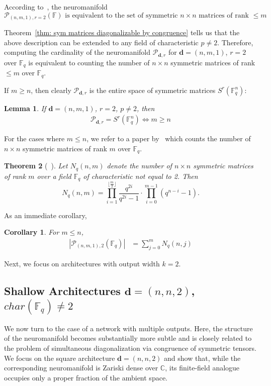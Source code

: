 \documentclass[a4paper]{cas-sc}
\newcommand{\dd}{\mathbf{d}}    %
\newcommand{\F}{\mathbb{F}}
\newtheorem{theorem}{Theorem}[section]
\newtheorem{corollary}{Corollary}[theorem]
\newtheorem{lemma}[theorem]{Lemma}
\begin{document}
    According to~\citet[Lemma~3.3]{KUBJAS24}, the neuromanifold
    \begin{equation}
    \label{eq: neuromanifold description}
        \text{$\mathcal{P}_{(n,m,1),r = 2}(\F)$ is equivalent to the set of symmetric $n\times n$ matrices of rank $\leq m$ }
    \end{equation}
    
    Theorem~\ref{thm: sym matrices diagonalizable by congruence} tells us that the above description can be extended to any field of characteristic $p \neq 2$. Therefore, computing the cardinality of the neuromanifold $\mathcal{P}_{\dd, r}$ for $\dd = (n,m,1)$, $r = 2$ over $\F_q$ is equivalent to counting the number of $n \times n$ symmetric matrices of rank $\leq m$ over $\F_q$.
    
    If $m \geq n$, then clearly $\mathcal{P}_{\dd,r}$ is the entire space of symmetric matrices $S^r(\mathbb{F}^n_q)$:
    \begin{lemma} \label{lem: r=2 p!=2 k=1 m>=n}
        If $\dd = (n,m,1)$, $r = 2$, $p \neq 2$, then
        \begin{align*}
            \mathcal{P}_{\dd, r} = S^r(\mathbb{F}^n_q) \iff m \geq n
        \end{align*}
    \end{lemma}
    For the cases where $m \leq n$, we refer to a paper by~\citet{WILLIAMS69} which counts the number of $n \times n$ symmetric matrices of rank $m$ over $\F_q$.
    \begin{theorem} [{~\citet[Theorem~2]{WILLIAMS69}}] \label{thm: number of symmetric n x n matrices of rank m}
        Let $N_q(n, m)$ denote the number of $n \times n$ symmetric matrices of rank $m$ over a field $\F_q$ of characteristic not equal to 2. Then
        \[
            N_q(n,m) = \prod_{i = 1}^{\lfloor{\frac{m}{2}}\rfloor}\frac{q^{2i}}{q^{2i} - 1} \cdot \prod_{i = 0}^{m - 1} (q^{n - i} - 1).
        \]
    \end{theorem}
        As an immediate corollary,
    \begin{corollary} \label{lem: r=2 p!=2 k=1 m<=n}
        For $m \leq n$,
        \begin{align*}
            |\mathcal{P}_{(n,m,1), 2}(\F_q)| &= \sum_{j = 0}^{m} N_q(n,j)
        \end{align*}
    \end{corollary}
    Next, we focus on architectures with output width $k=2$.
    
\subsection{Shallow Architectures $\dd=(n,n,2)$, $char(\F_q)\neq 2$}
    We now turn to the case of a network with multiple outputs. Here, the structure of the neuromanifold becomes substantially more subtle and is closely related to the problem of simultaneous diagonalization via congruence of symmetric tensors. We focus on the square architecture $\dd=(n,n,2)$ and show that, while the corresponding neuromanifold is Zariski dense over $\mathbb{C}$, its finite-field analogue occupies only a proper fraction of the ambient space.
\end{document}
